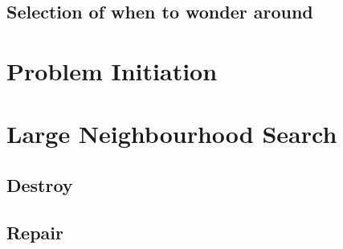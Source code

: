 \subsection{Selection of when to wonder around}



\section{Problem Initiation}



\section{Large Neighbourhood Search}

\subsection{Destroy}



\subsection{Repair}



